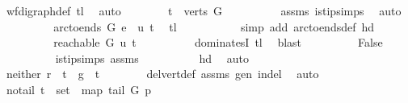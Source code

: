\begin{isabellebody}
\ wf{\isacharunderscore}{\kern0pt}digraph{\isacharunderscore}{\kern0pt}def\ tl\ \isamarkupfalse%
\ auto\isanewline
\ \ \ \ \ \ \isamarkupfalse%
\ {\isachardoublequoteopen}t\ {\isasymin}\ verts\ G{\isachardoublequoteclose}\isanewline
\ \ \ \ \ \ \ \ \isamarkupfalse%
\ assms{\isacharparenleft}{\kern0pt}{}{\isacharparenright}{\kern0pt}\ is{\isacharunderscore}{\kern0pt}tip{\isachardot}{\kern0pt}simps\ \isamarkupfalse%
\ auto\ \isanewline
\ \ \ \ \ \ \isamarkupfalse%
\ \isamarkupfalse%
\ {\isachardoublequoteopen}arc{\isacharunderscore}{\kern0pt}to{\isacharunderscore}{\kern0pt}ends\ G\ e\ {\isacharequal}{\kern0pt}\ {\isacharparenleft}{\kern0pt}u{\isacharcomma}{\kern0pt}\ t{\isacharparenright}{\kern0pt}{\isachardoublequoteclose}\ \isamarkupfalse%
\ tl\ \isanewline
\ \ \ \ \ \ \ \ \isamarkupfalse%
\ {\isacharparenleft}{\kern0pt}simp\ add{\isacharcolon}{\kern0pt}\ arc{\isacharunderscore}{\kern0pt}to{\isacharunderscore}{\kern0pt}ends{\isacharunderscore}{\kern0pt}def\ hd{\isacharparenright}{\kern0pt}\ \isanewline
\ \ \ \ \ \ \isamarkupfalse%
\ \isamarkupfalse%
\ {\isachardoublequoteopen}reachable{}\ G\ u\ t{\isachardoublequoteclose}\isanewline
\ \ \ \ \ \ \ \ \isamarkupfalse%
\ dominatesI\ tl\ \isamarkupfalse%
\ blast\isanewline
\ \ \ \ \ \ \isamarkupfalse%
\ \isamarkupfalse%
\ False\isanewline
\ \ \ \ \ \ \ \ \isamarkupfalse%
\ is{\isacharunderscore}{\kern0pt}tip{\isachardot}{\kern0pt}simps\ assms{\isacharparenleft}{\kern0pt}{}{\isacharparenright}{\kern0pt}\isanewline
\ \ \ \ \ \ \ \ \ \ hd\ \isamarkupfalse%
\ auto\ \ \isanewline
\ \ \ \ \isamarkupfalse%
\isanewline
\ \ \ \ \isamarkupfalse%
\ neither{\isacharcolon}{\kern0pt}\ {\isachardoublequoteopen}r\ {\isasymnoteq}\ t\ {\isasymand}\ g\ {\isasymnoteq}\ t{\isachardoublequoteclose}\isanewline
\ \ \ \ \ \ \isamarkupfalse%
\ del{\isacharunderscore}{\kern0pt}vert{\isacharunderscore}{\kern0pt}def\ assms{\isacharparenleft}{\kern0pt}{}{\isacharparenright}{\kern0pt}\ gen\ in{\isacharunderscore}{\kern0pt}del\ \isamarkupfalse%
\ auto\isanewline
\ \ \ \ \isamarkupfalse%
\ no{\isacharunderscore}{\kern0pt}tail{\isacharcolon}{\kern0pt}\ {\isachardoublequoteopen}t\ {\isasymnotin}\ {\isacharparenleft}{\kern0pt}set\ {\isacharparenleft}{\kern0pt}\ map\ {\isacharparenleft}{\kern0pt}tail\ G{\isacharparenright}{\kern0pt}\ p{\isacharparenright}{\kern0pt}{\isacharparenright}{\kern0pt}{\isachardoublequoteclose}\isanewline

\end{isabellebody}
